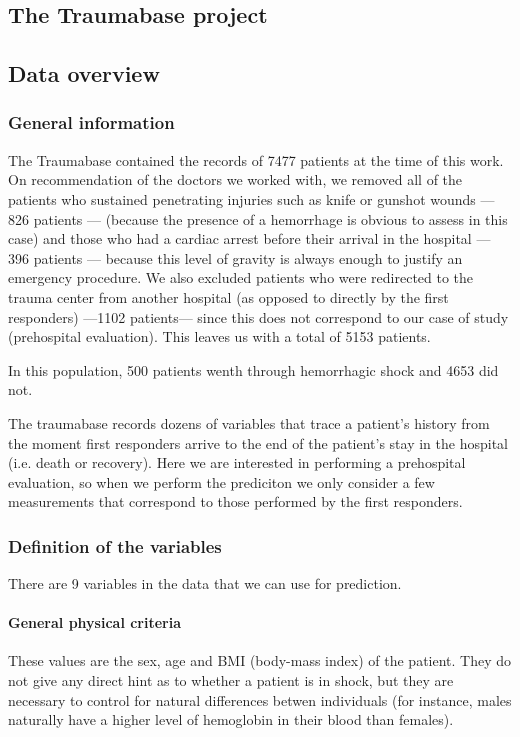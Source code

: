 		\subsection{The Traumabase project}
	
		\subsection{Data overview}
		
			\subsubsection{General information}
The Traumabase contained the records of 7477 patients at the time of this work. On recommendation of the doctors we worked with, we removed all of the patients who sustained penetrating injuries such as knife or gunshot wounds --- 826 patients --- (because the presence of a hemorrhage is obvious to assess in this case) and those who had a cardiac arrest before their arrival in the hospital --- 396 patients --- because this level of gravity is always enough to justify an emergency procedure. We also excluded patients who were redirected to the trauma center from another hospital (as opposed to directly by the first responders) ---1102 patients--- since this does not correspond to our case of study (prehospital evaluation). This leaves us with a total of 5153 patients.

In this population, 500 patients wenth through hemorrhagic shock and 4653 did not.
			
The traumabase records dozens of variables that trace a patient's history from the moment first responders arrive to the end of the patient's stay in the hospital (i.e. death or recovery). Here we are interested in performing a prehospital evaluation, so when we perform the prediciton we only consider a few measurements that correspond to those performed by the first responders. 

			\subsubsection{Definition of the variables}
There are 9 variables in the data that we can use for prediction.
\paragraph{General physical criteria}
These values are the sex, age and BMI (body-mass index) of the patient. They do not give any direct hint as to whether a patient is in shock, but they are necessary to control for natural differences betwen individuals (for instance, males naturally have a higher level of hemoglobin in their blood than females).

